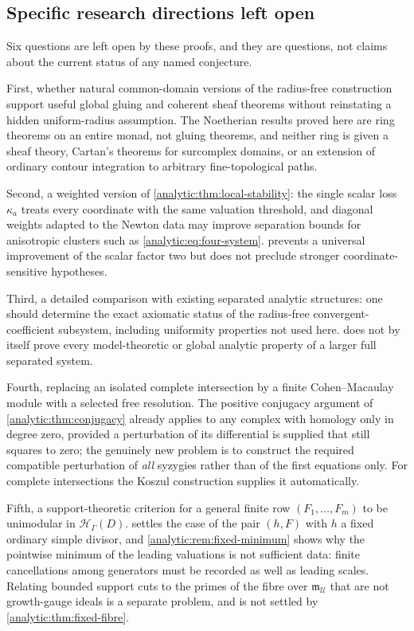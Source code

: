 \documentclass[11pt,letterpaper]{article}
\theoremstyle{definition}
\theoremstyle{remark}
\newcommand{\HH}{\mathcal H}
\newcommand{\UU}{\mathcal U}
\newcommand{\m}{\mathfrak m}
\numberwithin{equation}{section}
\begin{document}
\subsection{Specific research directions left open}
\label{analytic:subsec:open}
Six questions are left open by these proofs, and they are questions, not
claims about the current status of any named conjecture.

First, whether natural common-domain versions of the radius-free
construction support useful global gluing and coherent sheaf theorems
without reinstating a hidden uniform-radius assumption. The Noetherian
results proved here are ring theorems on an entire monad, not gluing
theorems, and neither ring is given a sheaf theory, Cartan's theorems for
surcomplex domains, or an extension of ordinary contour integration to
arbitrary fine-topological paths.

Second, a weighted version of
\cref{analytic:thm:local-stability}: the single scalar loss $\kappa_a$
treats every coordinate with the same valuation threshold, and diagonal
weights adapted to the Newton data may improve separation bounds for
anisotropic clusters such as
\eqref{analytic:eq:four-system}.  prevents a
universal improvement of the scalar factor two but does not preclude
stronger coordinate-sensitive hypotheses.

Third, a detailed comparison with existing separated analytic structures:
one should determine the exact axiomatic status of the radius-free
convergent-coefficient subsystem, including uniformity properties not used
here.  does not by itself prove every
model-theoretic or global analytic property of a larger full separated
system.

Fourth, replacing an isolated complete intersection by a finite
Cohen--Macaulay module with a selected free resolution. The positive
conjugacy argument of \cref{analytic:thm:conjugacy} already applies to any
complex with homology only in degree zero, provided a perturbation of its
differential is supplied that still squares to zero; the genuinely new
problem is to construct the required compatible perturbation of \emph{all}
syzygies rather than of the first equations only. For complete
intersections the Koszul construction supplies it automatically.

Fifth, a support-theoretic criterion for a general finite row
$(F_1,\ldots,F_m)$ to be unimodular in $\HH_\Gamma(D)$.
 settles the case of the pair $(h,F)$ with
$h$ a fixed ordinary simple divisor, and
\cref{analytic:rem:fixed-minimum} shows why the pointwise minimum of the
leading valuations is not sufficient data: finite cancellations among
generators must be recorded as well as leading scales. Relating bounded
support cuts to the primes of the fibre over $\m_\UU$ that are not
growth-gauge ideals is a separate problem, and is not settled by
\cref{analytic:thm:fixed-fibre}.
\end{document}
